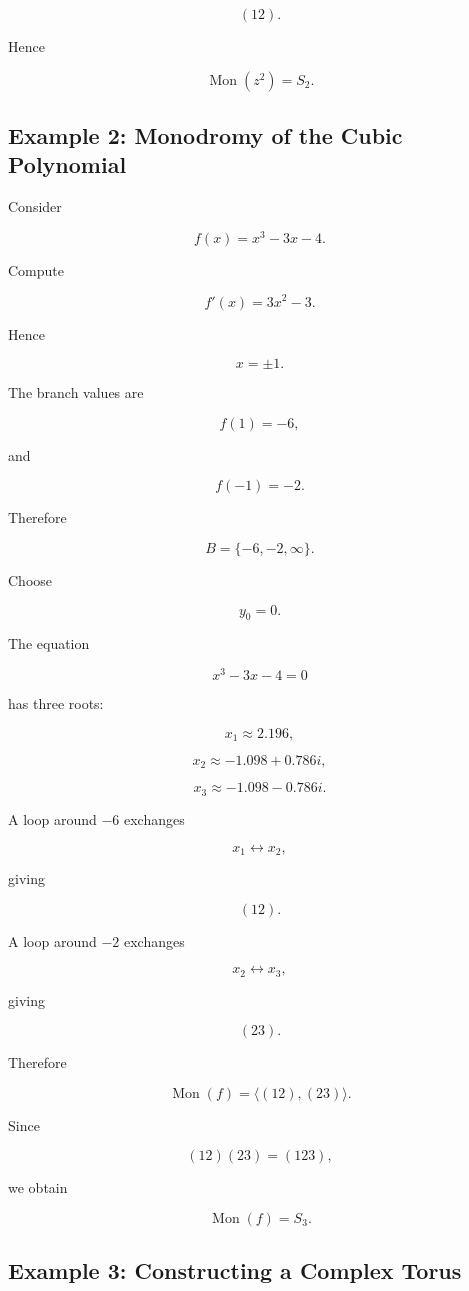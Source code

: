 \documentclass[12pt,a4paper]{article}
\theoremstyle{notespace}
\begin{document}
\[
(12).
\]

Hence

\[
\boxed{
	\operatorname{Mon}(z^2)=S_2.
}
\]

\subsection{Example 2: Monodromy of the Cubic Polynomial}

Consider

\[
f(x)=x^3-3x-4.
\]

Compute

\[
f'(x)=3x^2-3.
\]

Hence

\[
x=\pm1.
\]

The branch values are

\[
f(1)=-6,
\]

and

\[
f(-1)=-2.
\]

Therefore

\[
B=\{-6,-2,\infty\}.
\]

Choose

\[
y_0=0.
\]

The equation

\[
x^3-3x-4=0
\]

has three roots:

\[
x_1\approx2.196,
\]

\[
x_2\approx-1.098+0.786i,
\]

\[
x_3\approx-1.098-0.786i.
\]

A loop around \(-6\) exchanges

\[
x_1
\leftrightarrow
x_2,
\]

giving

\[
(12).
\]

A loop around \(-2\) exchanges

\[
x_2
\leftrightarrow
x_3,
\]

giving

\[
(23).
\]

Therefore

\[
\operatorname{Mon}(f)
=
\langle(12),(23)\rangle.
\]

Since

\[
(12)(23)=(123),
\]

we obtain

\[
\boxed{
	\operatorname{Mon}(f)=S_3.
}
\]

\subsection{Example 3: Constructing a Complex Torus}
\end{document}
